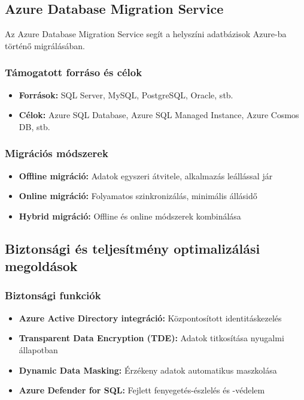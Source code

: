 \documentclass[a4paper,12pt]{article}
\begin{document}
    \subsection{Azure Database Migration Service}

    Az Azure Database Migration Service segít a helyszíni adatbázisok Azure-ba történő migrálásában.

    \subsubsection{Támogatott forráso és célok}

    \begin{itemize}
        \item \textbf{Források:} SQL Server, MySQL, PostgreSQL, Oracle, stb.
        \item \textbf{Célok:} Azure SQL Database, Azure SQL Managed Instance, Azure Cosmos DB, stb.
    \end{itemize}

    \subsubsection{Migrációs módszerek}

    \begin{itemize}
        \item \textbf{Offline migráció:} Adatok egyszeri átvitele, alkalmazás leállással jár
        \item \textbf{Online migráció:} Folyamatos szinkronizálás, minimális állásidő
        \item \textbf{Hybrid migráció:} Offline és online módszerek kombinálása
    \end{itemize}

    \subsection{Biztonsági és teljesítmény optimalizálási megoldások}

    \subsubsection{Biztonsági funkciók}

    \begin{itemize}
        \item \textbf{Azure Active Directory integráció:} Központosított identitáskezelés
        \item \textbf{Transparent Data Encryption (TDE):} Adatok titkosítása nyugalmi állapotban
        \item \textbf{Dynamic Data Masking:} Érzékeny adatok automatikus maszkolása
        \item \textbf{Azure Defender for SQL:} Fejlett fenyegetés-észlelés és -védelem
    \end{itemize}
\end{document}
